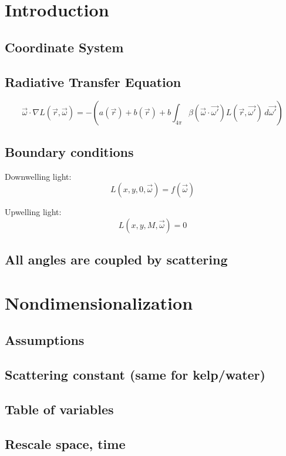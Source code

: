 \documentclass[10pt]{article}
\begin{document}
\section{Introduction}
\subsection{Coordinate System}
\subsection{Radiative Transfer Equation}
\begin{equation}
  \label{eq:RTE}
  \vec{\omega} \cdot \nabla L(\vec{r},\vec{\omega})
  = -(a(\vec{r}) + b(\vec{r}) + b\int_{4\pi}
  \beta(\vec{\omega} \cdot \vec{\omega'})
  L(\vec{r},\vec{\omega'}) \, d\vec{\omega'})
\end{equation}

\subsection{Boundary conditions}
Downwelling light:
\begin{equation}
  L(x,y,0, \vec{\omega}) = f(\vec{\omega})
\end{equation}

Upwelling light:
\begin{equation}
  L(x,y,M, \vec{\omega}) = 0
\end{equation}

\subsection{All angles are coupled by scattering}

\section{Nondimensionalization}
\subsection{Assumptions}
\subsection{Scattering constant (same for kelp/water)}
\subsection{Table of variables}
\subsection{Rescale space, time}
\end{document}
